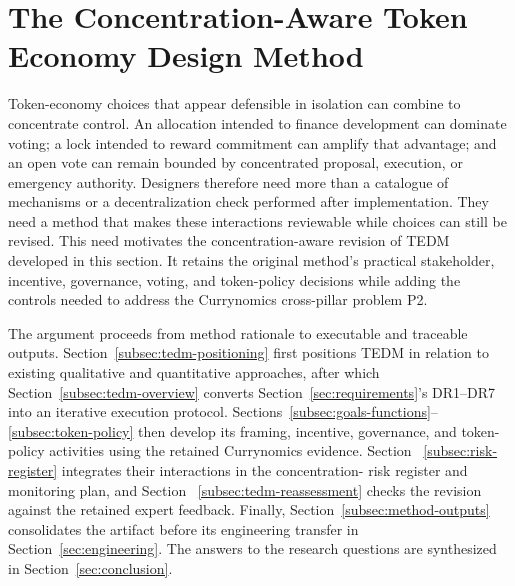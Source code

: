 \documentclass[referee,sn-basic]{sn-jnl}
\begin{document}
\section{The Concentration-Aware Token Economy Design Method}\label{sec:tedm}

Token-economy choices that appear defensible in isolation can combine to
concentrate control. An allocation intended to finance development can dominate
voting; a lock intended to reward commitment can amplify that advantage; and an
open vote can remain bounded by concentrated proposal, execution, or emergency
authority. Designers therefore need more than a catalogue of mechanisms or a
decentralization check performed after implementation. They need a method that
makes these interactions reviewable while choices can still be revised. This
need motivates the concentration-aware revision of TEDM developed in this
section. It retains the original method's practical stakeholder, incentive,
governance, voting, and token-policy decisions while adding the controls needed
to address the Currynomics cross-pillar problem P2.

The argument proceeds from method rationale to executable and traceable
outputs. Section~\ref{subsec:tedm-positioning} first positions TEDM in relation
to existing qualitative and quantitative approaches, after which
Section~\ref{subsec:tedm-overview} converts Section~\ref{sec:requirements}'s
DR1--DR7 into an iterative
execution protocol. Sections~\ref{subsec:goals-functions}--
\ref{subsec:token-policy} then develop its framing, incentive, governance, and
token-policy activities using the retained Currynomics evidence. Section~
\ref{subsec:risk-register} integrates their interactions in the concentration-
risk register and monitoring plan, and Section~
\ref{subsec:tedm-reassessment} checks the revision against the retained expert
feedback. Finally, Section~\ref{subsec:method-outputs} consolidates the artifact
before its engineering transfer in Section~\ref{sec:engineering}. The answers to
the research questions are synthesized in Section~\ref{sec:conclusion}.
\end{document}
